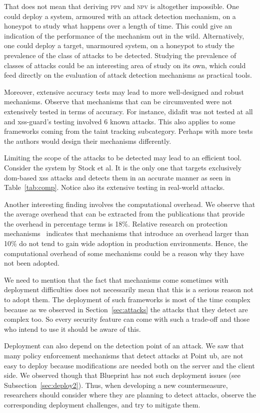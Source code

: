 \documentclass[conference]{IEEEtran}
\begin{document}
That does not mean that deriving \textsc{ppv} and \textsc{npv} is
altogether impossible. One could deploy a system, armoured with an
attack detection mechanism, on a honeypot to study what happens over
a length of time. This could give an indication of the performance of
the mechanism out in the wild. Alternatively, one could deploy a
target, unarmoured system, on a honeypot to study the prevalence of
the class of attacks to be detected. Studying the prevalence of
classes of attacks could be an interesting area of study on its own,
which could feed directly on the evaluation of attack detection
mechanisms as practical tools.

Moreover, extensive accuracy tests may lead to more
well-designed and robust mechanisms. Observe that mechanisms
that can be circumvented were not extensively tested
in terms of accuracy. For instance, {\sc didafit}
was not tested at all and {\sc xss-guard}'s testing involved
6 known attacks. This also applies to some frameworks coming
from the taint tracking subcategory.
Perhaps with more tests the authors would design
their mechanisms differently.

Limiting the scope of the attacks to
be detected may lead to an efficient tool.
Consider the system by Stock et al. It is the only one
that targets exclusively {\sc dom}-based
{\sc xss} attacks and detects them in an accurate manner
as seen in Table~\ref{tab:comp}. Notice also
its extensive testing in real-world attacks.

Another interesting finding involves the computational overhead.
We observe that the average overhead that can be extracted from
the publications that provide the overhead in percentage terms is
18\%. Relative research on protection mechanisms~\cite{SPWS13}
indicates that mechanisms that introduce an overhead
larger than 10\% do not tend to gain wide adoption in
production environments. Hence, the computational overhead
of some mechanisms could be a reason why they have not been adopted.

We need to mention that the fact that mechanisms come
sometimes with deployment difficulties does
not necessarily mean that this is a serious reason
not to adopt them. The deployment of such frameworks
is most of the time complex because as we observed
in Section~\ref{sec:attacks} the attacks that they
detect are complex too. So every security feature can
come with such a trade-off and those who intend to use it
should be aware of this.

Deployment can also depend on the detection point
of an attack. We saw that many policy enforcement
mechanisms that detect attacks at Point {\sc ub},
are not easy to deploy because modifications
are needed both on the server and the client side.
We observed though that Blueprint has not such
deployment issues (see Subsection~\ref{sec:deploy2}).
Thus, when developing a new countermeasure,
researchers should consider where they are planning
to detect attacks, observe the corresponding
deployment challenges, and try to mitigate them.
\end{document}
